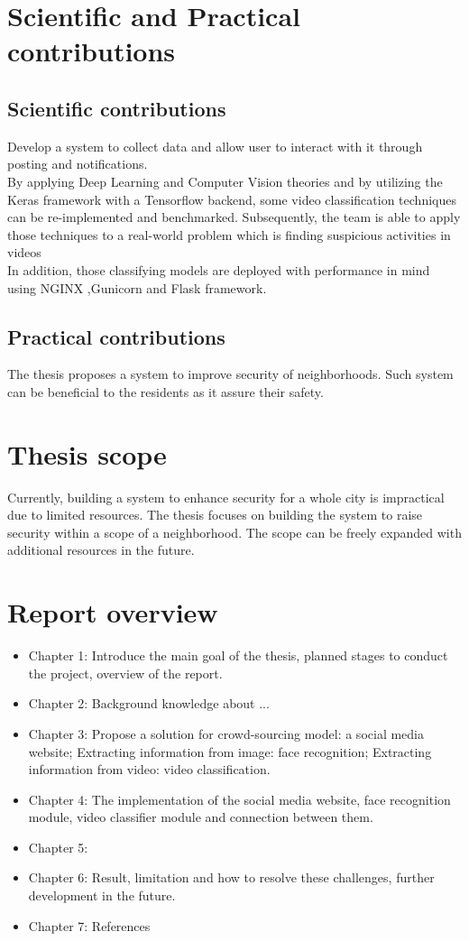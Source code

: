 \section{Scientific and Practical contributions}
\subsection{Scientific contributions}
Develop a system to collect data and allow user to interact with it through posting and notifications. \\
By applying Deep Learning and Computer Vision theories and by utilizing the Keras framework with a Tensorflow backend, some video classification techniques can be re-implemented and benchmarked. Subsequently, the team is able to apply those techniques to a real-world problem which is finding suspicious activities in videos \\ %
In addition, those classifying models are deployed with performance in mind using NGINX ,Gunicorn and Flask framework.
\subsection{Practical contributions}
The thesis proposes a system to improve security of neighborhoods. Such system can be beneficial to the residents as it assure their safety.
\section{Thesis scope}
Currently, building a system to enhance security for a whole city is impractical due to limited resources. The thesis focuses on building the system to raise security within a scope of a neighborhood. The scope can be freely expanded with additional resources in the future.
\section{Report overview}
\begin{itemize}
	\item Chapter 1: Introduce the main goal of the thesis, planned stages to conduct the project, overview of the report.
	\item Chapter 2: Background knowledge about ...
	\item Chapter 3: Propose a solution for crowd-sourcing model: a social media website; Extracting information from image: face recognition; Extracting information from video: video classification.
	\item Chapter 4: The implementation of the social media website, face recognition module, video classifier module and connection between them.
	\item Chapter 5: 
	\item Chapter 6: Result, limitation and how to resolve these challenges, further development in the future.
	\item Chapter 7: References
\end{itemize} 
